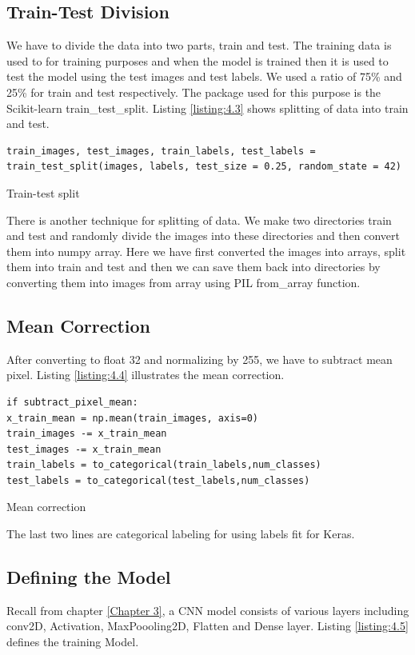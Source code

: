 \subsection{Train-Test Division}
We have to divide the data into two parts, train and test. The training data
is used to for training purposes and when the model is trained then it is
used to test the model using the test images and test labels. We used a ratio of 75\% and
25\% for train and test respectively. The package used for this purpose is the
Scikit-learn train\_test\_split. Listing \ref{listing:4.3} shows splitting of
data into train and test.

\begin{listing}[H]
    \begin{verbatim}
train_images, test_images, train_labels, test_labels = 
train_test_split(images, labels, test_size = 0.25, random_state = 42)
\end{verbatim}
\caption{Train-test split}
\label{listing:4.3}
\end{listing}
There is another technique for splitting of data. We make two directories
train and test and randomly divide the images into these directories and then
convert them into numpy array. Here we have first converted the images
into arrays, split them into train and test and then we can save them back into
directories by converting them into images from array using PIL from\_array
function.

\subsection{Mean Correction}
After converting to float 32 and normalizing by 255, we have to subtract mean pixel.
Listing \ref{listing:4.4} illustrates the mean correction.

\begin{listing}[H]
    \begin{verbatim}
if subtract_pixel_mean:
x_train_mean = np.mean(train_images, axis=0)
train_images -= x_train_mean
test_images -= x_train_mean
train_labels = to_categorical(train_labels,num_classes)
test_labels = to_categorical(test_labels,num_classes)
    \end{verbatim}
    \caption{Mean correction}
\label{listing:4.4}
\end{listing}
\noindent The last two lines are categorical labeling for using labels fit for Keras.
\subsection{Defining the Model}
Recall from chapter \ref{Chapter 3}, a CNN model consists of various layers including
conv2D, Activation, MaxPoooling2D, Flatten and Dense layer. Listing \ref{listing:4.5}
defines the training Model.

